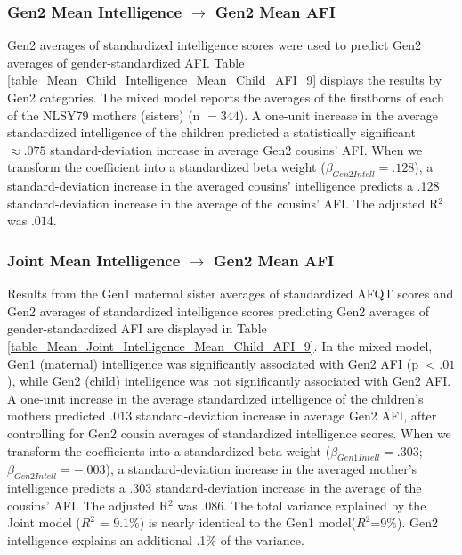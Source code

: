 \subsubsection{Gen2 Mean Intelligence $\rightarrow$ Gen2 Mean AFI} Gen2 averages of standardized intelligence scores were used to predict Gen2 averages of gender-standardized AFI. Table \ref{table_Mean_Child_Intelligence_Mean_Child_AFI_9} displays the results by Gen2 categories. The mixed model reports the averages of the firstborns of each of the NLSY79 mothers (sisters) (n $= 344$). A one-unit increase in the average standardized intelligence of the children predicted a statistically significant $\approx .075$ standard-deviation increase in average Gen2 cousins' AFI. When we transform the coefficient into a standardized beta weight ($\beta_{Gen2 Intell} = .128$), a standard-deviation increase in the averaged cousins' intelligence predicts a .128 standard-deviation increase in the average of the cousins' AFI. The adjusted R$^{2}$ was $.014$.

\subsubsection{Joint Mean Intelligence $\rightarrow$ Gen2 Mean AFI} Results from the Gen1 maternal sister averages of standardized AFQT scores and Gen2 averages of standardized intelligence scores predicting Gen2 averages of gender-standardized AFI are displayed in Table \ref{table_Mean_Joint_Intelligence_Mean_Child_AFI_9}. In the mixed model, Gen1 (maternal) intelligence was significantly associated with Gen2 AFI (p $< .01$), while Gen2 (child) intelligence was not significantly associated with Gen2 AFI. A one-unit increase in the average standardized intelligence of the children's mothers predicted $.013$ standard-deviation increase in average Gen2 AFI, after controlling for Gen2 cousin averages of standardized intelligence scores. When we transform the coefficients into a standardized beta weight ($\beta_{Gen1 Intell} = .303$; $\beta_{Gen2 Intell} = -.003$), a standard-deviation increase in the averaged mother's intelligence predicts a .303 standard-deviation increase in the average of the cousins' AFI. The adjusted R$^{2}$ was $.086$. The total variance explained by the Joint model ($R^{2}$ = 9.1$\%$) is nearly identical to the Gen1 model($R^{2}$=9$\%$). Gen2 intelligence explains an additional .1\% of the variance.

